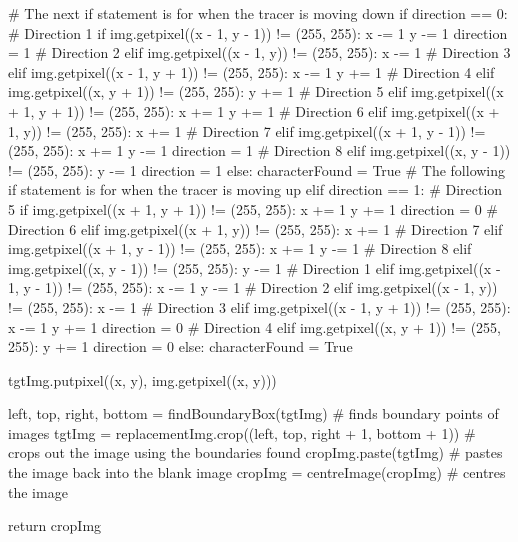\documentclass{report}
\begin{document}
\begin{python}
        #  The next if statement is for when the tracer is moving down
        if direction == 0:
            # Direction 1
            if img.getpixel((x - 1, y - 1)) != (255, 255):
                x -= 1
                y -= 1
                direction = 1
            # Direction 2
            elif img.getpixel((x - 1, y)) != (255, 255):
                x -= 1
            # Direction 3
            elif img.getpixel((x - 1, y + 1)) != (255, 255):
                x -= 1
                y += 1
            # Direction 4
            elif img.getpixel((x, y + 1)) != (255, 255):
                y += 1
            # Direction 5
            elif img.getpixel((x + 1, y + 1)) != (255, 255):
                x += 1
                y += 1
            # Direction 6
            elif img.getpixel((x + 1, y)) != (255, 255):
                x += 1
            # Direction 7
            elif img.getpixel((x + 1, y - 1)) != (255, 255):
                x += 1
                y -= 1
                direction = 1
            # Direction 8
            elif img.getpixel((x, y - 1)) != (255, 255):
                y -= 1
                direction = 1
            else:
                characterFound = True
        #  The following if statement is for when the tracer is moving up
        elif direction == 1:
            # Direction 5
            if img.getpixel((x + 1, y + 1)) != (255, 255):
                x += 1
                y += 1
                direction = 0
            # Direction 6
            elif img.getpixel((x + 1, y)) != (255, 255):
                x += 1
            # Direction 7
            elif img.getpixel((x + 1, y - 1)) != (255, 255):
                x += 1
                y -= 1
            # Direction 8
            elif img.getpixel((x, y - 1)) != (255, 255):
                y -= 1
            # Direction 1
            elif img.getpixel((x - 1, y - 1)) != (255, 255):
                x -= 1
                y -= 1
            # Direction 2
            elif img.getpixel((x - 1, y)) != (255, 255):
                x -= 1
            # Direction 3
            elif img.getpixel((x - 1, y + 1)) != (255, 255):
                x -= 1
                y += 1
                direction = 0
            # Direction 4
            elif img.getpixel((x, y + 1)) != (255, 255):
                y += 1
                direction = 0
            else:
                characterFound = True

    tgtImg.putpixel((x, y), img.getpixel((x, y)))

    left, top, right, bottom = findBoundaryBox(tgtImg)  # finds boundary points of images
    tgtImg = replacementImg.crop((left, top, right + 1, bottom + 1))  # crops out the image using the boundaries found
    cropImg.paste(tgtImg)  # pastes the image back into the blank image
    cropImg = centreImage(cropImg)  # centres the image

    return cropImg
\end{python}
\end{document}
